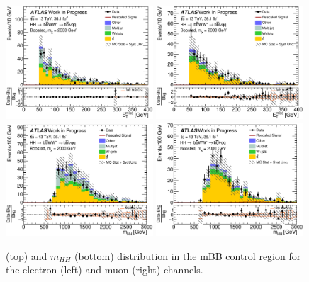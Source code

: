 \begin{figure}[H]
\begin{center}
\includegraphics[width=0.49\textwidth]{figures/kinplots/C_2tag_mbbcr_elec_presel_met50_MET}
\includegraphics[width=0.49\textwidth]{figures/kinplots/C_2tag_mbbcr_muon_presel_met50_MET}\\
\includegraphics[width=0.49\textwidth]{figures/kinplots/C_2tag_mbbcr_elec_presel_met50_hhMassRebin1}
\includegraphics[width=0.49\textwidth]{figures/kinplots/C_2tag_mbbcr_muon_presel_met50_hhMassRebin1}
\caption[Kinematic distributions in the mBB control region for the electron and muon channels]{\met (top) and $m_{HH}$ (bottom) distribution in the mBB control region for the electron (left) and muon (right) channels.}
\label{fig:mbbcr_plots_b}
\end{center}
\end{figure}


